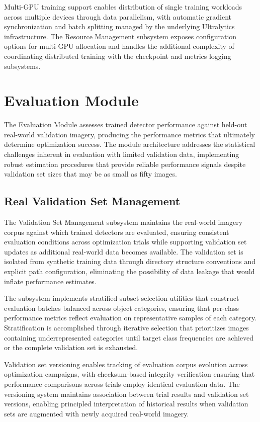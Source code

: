 Multi-GPU training support enables distribution of single training workloads across multiple devices through data parallelism, with automatic gradient synchronization and batch splitting managed by the underlying Ultralytics infrastructure. The Resource Management subsystem exposes configuration options for multi-GPU allocation and handles the additional complexity of coordinating distributed training with the checkpoint and metrics logging subsystems.

\section{Evaluation Module}
\label{sec:evaluation_module}

The Evaluation Module assesses trained detector performance against held-out real-world validation imagery, producing the performance metrics that ultimately determine optimization success. The module architecture addresses the statistical challenges inherent in evaluation with limited validation data, implementing robust estimation procedures that provide reliable performance signals despite validation set sizes that may be as small as fifty images.

\subsection{Real Validation Set Management}

The Validation Set Management subsystem maintains the real-world imagery corpus against which trained detectors are evaluated, ensuring consistent evaluation conditions across optimization trials while supporting validation set updates as additional real-world data becomes available. The validation set is isolated from synthetic training data through directory structure conventions and explicit path configuration, eliminating the possibility of data leakage that would inflate performance estimates.

The subsystem implements stratified subset selection utilities that construct evaluation batches balanced across object categories, ensuring that per-class performance metrics reflect evaluation on representative samples of each category. Stratification is accomplished through iterative selection that prioritizes images containing underrepresented categories until target class frequencies are achieved or the complete validation set is exhausted.

Validation set versioning enables tracking of evaluation corpus evolution across optimization campaigns, with checksum-based integrity verification ensuring that performance comparisons across trials employ identical evaluation data. The versioning system maintains association between trial results and validation set versions, enabling principled interpretation of historical results when validation sets are augmented with newly acquired real-world imagery.

